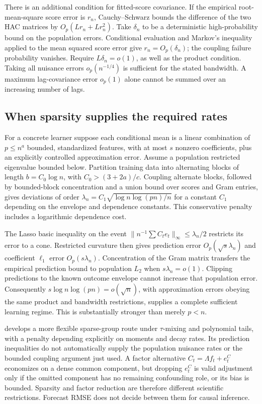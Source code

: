 There is an additional condition for fitted-score covariance. If the
empirical root-mean-square score error is $r_n$, Cauchy--Schwarz bounds
the difference of the two HAC matrices by $O_p(Lr_n+Lr_n^2)$.
Take $\delta_n$ to be a deterministic high-probability bound on the
population errors. Conditional evaluation and Markov's inequality applied
to the mean squared score error give $r_n=O_p(\delta_n)$; the coupling
failure probability vanishes. Require $L\delta_n=o(1)$, as well as the product condition.
Taking all nuisance errors $o_p(n^{-1/4})$ is sufficient for the stated
bandwidth. A maximum lag-covariance error $o_p(1)$ alone cannot be
summed over an increasing number of lags.

\subsection{When sparsity supplies the required rates}
For a concrete learner suppose each conditional mean is a linear combination
of $p\le n^a$ bounded, standardized features, with at most $s$ nonzero
coefficients, plus an explicitly controlled approximation error. Assume
a population restricted eigenvalue bounded below. Partition training data
into alternating blocks of length $b=C_0\log n$, with
$C_0>(3+2a)/c$. Coupling alternate blocks, followed by bounded-block
concentration and a union bound over scores and Gram entries, gives
deviations of order $\lambda_n=C_1\sqrt{\log n\log(pn)/n}$ for a
constant $C_1$ depending on the envelope and dependence constants.
This conservative penalty includes a logarithmic dependence cost.

The Lasso basic inequality on the event
$\|n^{-1}\sum C_te_t\|_\infty\le\lambda_n/2$ restricts its error
to a cone. Restricted curvature then gives prediction error
$O_p(\sqrt{s}\lambda_n)$ and coefficient $\ell_1$ error
$O_p(s\lambda_n)$. Concentration of the Gram matrix transfers the
empirical prediction bound to population $L_2$ when $s\lambda_n=o(1)$.
Clipping predictions to the known outcome envelope cannot increase that
population error. Consequently
$s\log n\log(pn)=o(\sqrt n)$, with approximation errors obeying the
same product and bandwidth restrictions, supplies a complete sufficient
learning regime. This is substantially stronger than merely $p<n$.

\citet[Assumptions 3.1--3.4 and Theorem 3.1]{babii2020} develops a more
flexible sparse-group route under $\tau$-mixing and polynomial tails,
with a penalty depending explicitly on moments and decay rates. Its
prediction inequalities do not automatically supply the population nuisance
rates or the bounded coupling argument just used. A factor alternative
$C_t=\Lambda f_t+e_t^C$ economizes on a dense common component, but
dropping $e_t^C$ is valid adjustment only if the omitted component has no
remaining confounding role, or its bias is bounded. Sparsity and factor
reduction are therefore different scientific restrictions. Forecast RMSE
does not decide between them for causal inference.

